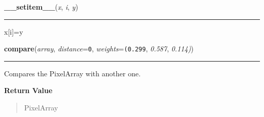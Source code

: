     \label{pygame:PixelArray:__setitem__}

    \vspace{0.5ex}

\hspace{.8\funcindent}\begin{boxedminipage}{\funcwidth}

    \raggedright \textbf{\_\_setitem\_\_}(\textit{x}, \textit{i}, \textit{y})

    \vspace{-1.5ex}

    \rule{\textwidth}{0.5\fboxrule}
\setlength{\parskip}{2ex}
    x[i]=y

\setlength{\parskip}{1ex}
    \end{boxedminipage}

    \label{pygame:PixelArray:compare}

    \vspace{0.5ex}

\hspace{.8\funcindent}\begin{boxedminipage}{\funcwidth}

    \raggedright \textbf{compare}(\textit{array}, \textit{distance}={\tt 0}, \textit{weights}={\tt (0.299}, \textit{0.587}, \textit{0.114)})

    \vspace{-1.5ex}

    \rule{\textwidth}{0.5\fboxrule}
\setlength{\parskip}{2ex}
    Compares the PixelArray with another one.

\setlength{\parskip}{1ex}
      \textbf{Return Value}
    \vspace{-1ex}

      \begin{quote}
      PixelArray

      \end{quote}

    \end{boxedminipage}

    \label{pygame:PixelArray:extract}

    \vspace{0.5ex}

